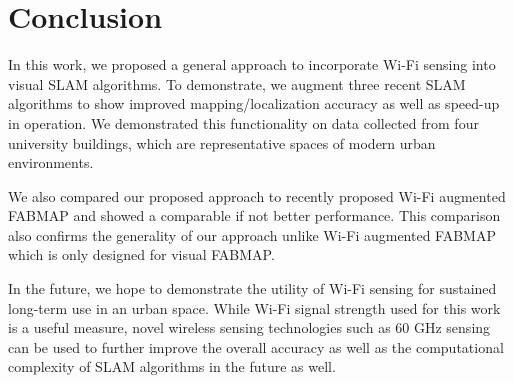 \section{Conclusion}
\label{sec:conc}
In this work, we proposed a general approach to incorporate Wi-Fi sensing into visual SLAM algorithms. To demonstrate, 
we augment three recent SLAM algorithms to show improved mapping/localization accuracy as well as speed-up in operation. 
We demonstrated this functionality on data collected from four university buildings, which are representative spaces of modern urban environments.

We also compared our proposed approach to recently proposed Wi-Fi augmented FABMAP and showed a comparable if not better performance.
This comparison also confirms the generality of our approach unlike Wi-Fi augmented FABMAP which is only designed for visual FABMAP.

In the future, we hope to demonstrate the utility of Wi-Fi sensing for sustained long-term use in an urban space. 
While Wi-Fi signal strength used for this work is a useful measure, novel wireless sensing technologies such as 60 GHz sensing can be used to further improve the overall accuracy as well as the computational complexity of SLAM algorithms in the future as well.
